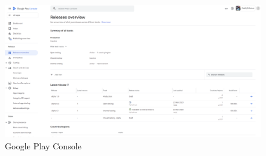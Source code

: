 \begin{figure}[ht]
    \centering
    \includegraphics[width=.9\textwidth]{img/GooglePlayConsole.png}
    \caption{Google Play Console}
    \label{fig:GooglePlayConsole}
\end{figure}